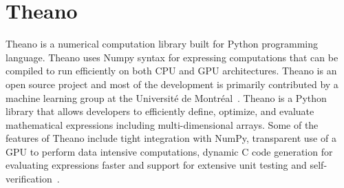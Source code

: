 \section{Theano}


Theano is a numerical computation library built for Python programming
language. Theano uses Numpy syntax for expressing computations that
can be compiled to run efficiently on both CPU and GPU
architectures. Theano is an open source project and most of the
development is primarily contributed by a machine learning group at
the Universit\'{e} de Montr\'{e}al~\cite{hid-sp18-510-wiki-theano}. Theano is
a Python library that allows developers to efficiently define,
optimize, and evaluate mathematical expressions including
multi-dimensional arrays. Some of the features of Theano include tight
integration with NumPy, transparent use of a GPU to perform data
intensive computations, dynamic C code generation for evaluating
expressions faster and support for extensive unit testing and
self-verification~\cite{hid-sp18-510-web-theano}.
